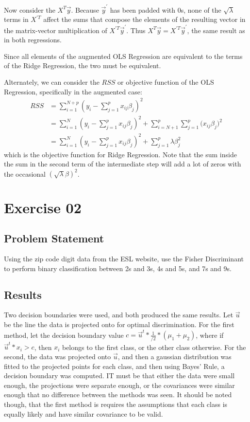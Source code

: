 \documentclass{article}
\begin{document}
Now consider the $X^{T}\vec{y}$. Because $\vec{y}^\prime$ has been padded with $0$s, none of the $\sqrt{\lambda}$ terms in $X^{\prime T}$ affect the sums that compose the elements of the resulting vector in the matrix-vector multiplication of $X^{\prime T}\vec{y}^\prime$. Thus $X^{T}\vec{y} = X^{\prime T}\vec{y}^\prime$, the same result as in both regressions.

Since all elements of the augmented OLS Regression are equivalent to the terms of the Ridge Regression, the two must be equivalent.

Alternately, we can consider the $RSS$ or objective function of the OLS Regression, specifically in the augmented case:
\begin{align*}
  RSS &= \sum_{i=1}^{N + p}{(y_{i} - \sum_{j=1}^{p}{x_{ij}\beta_{j}})^{2}}\\
      &= \sum_{i=1}^{N}{(y_{i} - \sum_{j=1}^{p}{x_{ij}\beta_{j}})^{2}} + \sum_{i=N+1}^{p}{\sum_{j=1}^{p}{(x_{ij}\beta_{j}})^{2}}\\
      &= \sum_{i=1}^{N}{(y_{i} - \sum_{j=1}^{p}{x_{ij}\beta_{j}})^{2}} + \sum_{j=1}^{p}{\lambda\beta_{j}^{2}}
\end{align*}
which is the objective function for Ridge Regression. Note that the sum inside the sum in the second term of the intermediate step will add a lot of zeros with the occasional $(\sqrt{\lambda}\beta)^{2}$.

%
\newpage
\section{Exercise 02}
\subsection{Problem Statement}
Using the zip code digit data from the ESL website, use the Fisher Discriminant to perform binary classification between 2s and 3s, 4s and 5s, and 7s and 9s.

\subsection{Results}
Two decision boundaries were used, and both produced the same results. Let $\vec{u}$ be the line the data is projected onto for optimal discrimination. For the first method, let the decision boundary value $c = \vec{u}^{t} * \frac{1}{/2} * (\mu_{1} + \mu_{2})$, where if $\vec{u}^{t} * x_{i} > c$, then $x_{i}$ belongs to the first class, or the other class otherwise. For the second, the data was projected onto $\vec{u}$, and then a gaussian distribution was fitted to the projected points for each class, and then using Bayes' Rule, a decision boundary was computed. IT must be that either the data were small enough, the projections were separate enough, or the covariances were similar enough that no difference between the methods was seen. It should be noted though, that the first method is requires the assumptions that each class is equally likely and have similar covariance to be valid.
\end{document}
